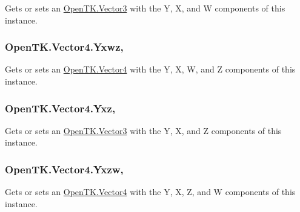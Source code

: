Gets or sets an \hyperlink{struct_open_t_k_1_1_vector3}{Open\-T\-K.\-Vector3} with the Y, X, and W components of this instance. 

\hypertarget{struct_open_t_k_1_1_vector4_ab5204cd89bf9656f00868a6ed7be4d59}{
\subsubsection[{Yxwz}]{ Open\-T\-K.\-Vector4.\-Yxwz\hspace{0.3cm}{\ttfamily [get]}, {\ttfamily [set]}}}\label{struct_open_t_k_1_1_vector4_ab5204cd89bf9656f00868a6ed7be4d59}


Gets or sets an \hyperlink{struct_open_t_k_1_1_vector4}{Open\-T\-K.\-Vector4} with the Y, X, W, and Z components of this instance. 

\hypertarget{struct_open_t_k_1_1_vector4_afe3098c92a5d4ec77e9e7533baca2efe}{
\subsubsection[{Yxz}]{ Open\-T\-K.\-Vector4.\-Yxz\hspace{0.3cm}{\ttfamily [get]}, {\ttfamily [set]}}}\label{struct_open_t_k_1_1_vector4_afe3098c92a5d4ec77e9e7533baca2efe}


Gets or sets an \hyperlink{struct_open_t_k_1_1_vector3}{Open\-T\-K.\-Vector3} with the Y, X, and Z components of this instance. 

\hypertarget{struct_open_t_k_1_1_vector4_abb85791f07c957726ab2e9351851b8a1}{
\subsubsection[{Yxzw}]{ Open\-T\-K.\-Vector4.\-Yxzw\hspace{0.3cm}{\ttfamily [get]}, {\ttfamily [set]}}}\label{struct_open_t_k_1_1_vector4_abb85791f07c957726ab2e9351851b8a1}


Gets or sets an \hyperlink{struct_open_t_k_1_1_vector4}{Open\-T\-K.\-Vector4} with the Y, X, Z, and W components of this instance. 

